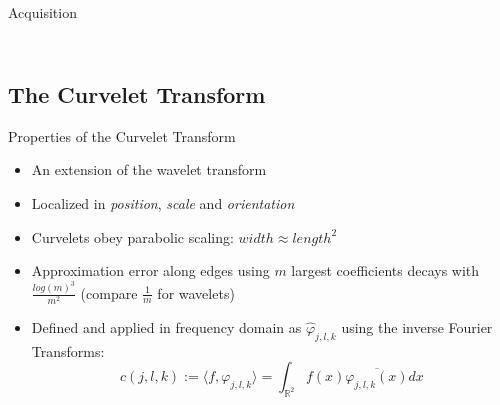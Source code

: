 \documentclass[mathserif]{beamer}
\begin{document}
\begin{frame}{Acquisition}
\begin{columns}[T]
\begin{column}{0.5\textwidth}
{            }
        \end{column}
    \end{columns}
\end{frame}

\subsection{The Curvelet Transform}
\begin{frame}{Properties of the Curvelet Transform}
    \begin{itemize}
        \item An extension of the wavelet transform
        \item Localized in \emph{position}, \emph{scale} and \emph{orientation}
        \item Curvelets obey parabolic scaling: $width \approx length^2$
        \item Approximation error along edges using $m$ largest coefficients decays with $\frac{log(m)^3}{m^2}$ (compare $\frac{1}{m}$ for wavelets)
        \item Defined and applied in frequency domain as $\hat{\varphi}_{j, l, k}$ using the inverse Fourier Transforms:
            \begin{equation*}
                c(j, l, k) := \langle f, \varphi_{j, l, k} \rangle = \int_{\mathbb{R}^2} f(x) \overline{\varphi_{j, l, k}(x)} dx
            \end{equation*}
    \end{itemize}
\end{frame}
\end{document}
